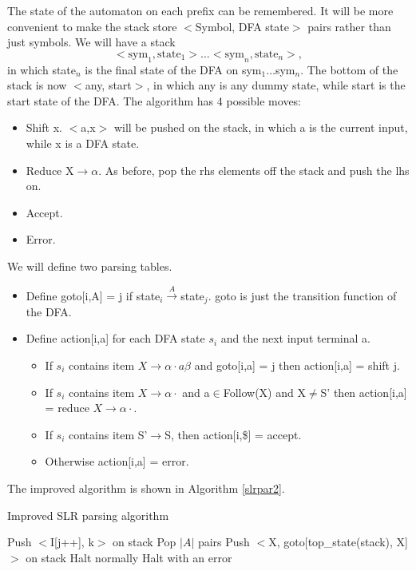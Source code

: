 The state of the automaton on each prefix can be remembered. It will be more convenient to make the stack store $<$Symbol, DFA state$>$ pairs rather than just symbols. We will have a stack 
$$<\text{sym}_1,\text{state}_1>\dots<\text{sym}_n,\text{state}_n>,$$
in which state$_n$ is the final state of the DFA on sym$_1\dots$sym$_n$. The bottom of the stack is now $<$any, start$>$, in which any is any dummy state, while start is the start state of the DFA. The algorithm has 4 possible moves:
\begin{itemize}
\item Shift x. $<$a,x$>$ will be pushed on the stack, in which a is the current input, while x is a DFA state.
\item Reduce X$\rightarrow\alpha$. As before, pop the rhs elements off the stack and push the lhs on.
\item Accept.
\item Error.
\end{itemize}
We will define two parsing tables.
\begin{itemize}
\item Define \textsf{goto[i,A] = j} if state$_i\xrightarrow{A}$state$_j$. \textsf{goto} is just the transition function of the DFA.
\item Define \textsf{action[i,a]} for each DFA state $s_i$ and the next input terminal a.
\begin{itemize}
\item If $s_i$ contains item $X\rightarrow\alpha\cdot a\beta$ and \textsf{goto[i,a] = j} then \textsf{action[i,a] = shift j}.
\item If $s_i$ contains item $X\rightarrow\alpha\cdot$ and a$\in$Follow(X) and X$\neq$S' then \textsf{action[i,a] = reduce $X\rightarrow\alpha\cdot$}.
\item If $s_i$ contains item S'$\rightarrow$S, then \textsf{action[i,\$] = accept}.
\item Otherwise \textsf{action[i,a] = error}.
\end{itemize}\end{itemize}
The improved algorithm is shown in Algorithm \eqref{slrpar2}.
\begin{algorithm}[ht]
\caption{Improved SLR parsing algorithm}\label{slrpar2}
\begin{algorithmic}
\Repeat
		\State Push $<$I[j++], k$>$ on stack
	\endcase
		\State Pop $|A|$ pairs
		\State Push $<$X, goto[top\_state(stack), X]$>$ on stack
	\endcase
		\State Halt normally
	\endcase
		\State Halt with an error
	\endcase
	\endswitch
{}
\end{algorithmic}
\end{algorithm}

